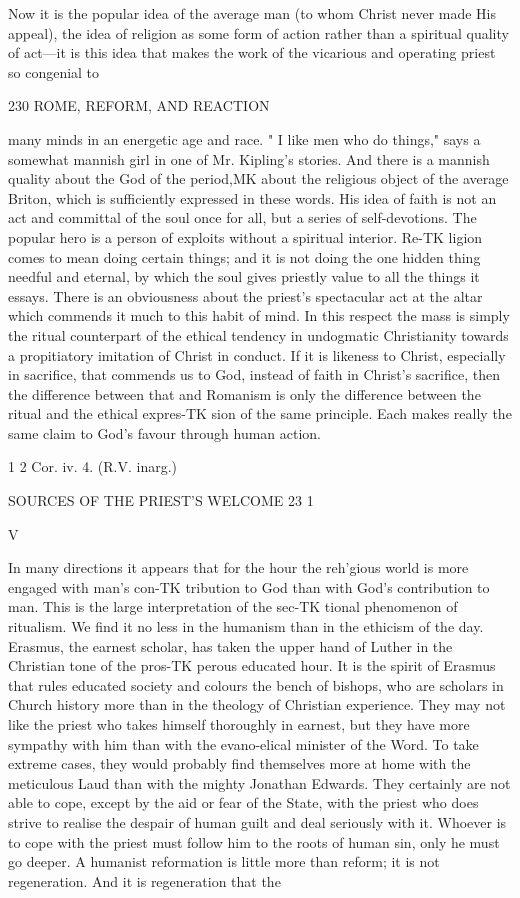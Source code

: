 \documentclass[12pt,a5paper,twoside]{book}
\begin{document}
{{Now it is the popular idea of the average man (to 
whom Christ never made His appeal), the idea of 
religion as some form of action rather than a spiritual 
quality of act---it is this idea that makes the work of 
the vicarious and operating priest so congenial to 



230 ROME, REFORM, AND REACTION 

many minds in an energetic age and race. " I like 
men who do things," says a somewhat mannish girl 
in one of Mr. Kipling's stories. And there is a 
mannish quality about the God of the period,MK about 
the religious object of the average Briton, which is 
sufficiently expressed in these words. His idea of 
faith is not an act and committal of the soul once for 
all, but a series of self-devotions. The popular hero is 
a person of exploits without a spiritual interior. Re-TK
ligion comes to mean doing certain things; and it is 
not doing the one hidden thing needful and eternal, by 
which the soul gives priestly value to all the things 
it essays. There is an obviousness about the priest's 
spectacular act at the altar which commends it much 
to this habit of mind. In this respect the mass is 
simply the ritual counterpart of the ethical tendency 
in undogmatic Christianity towards a propitiatory 
imitation of Christ in conduct. If it is likeness to 
Christ, especially in sacrifice, that commends us to 
God, instead of faith in Christ's sacrifice, then the 
difference between that and Romanism is only the 
difference between the ritual and the ethical expres-TK
sion of the same principle. Each makes really the 
same claim to God's favour through human action. 

1 2 Cor. iv. 4. (R.V. inarg.) 



SOURCES OF THE PRIEST'S WELCOME 23 1 

V 

In many directions it appears that for the hour 
the reh'gious world is more engaged with man's con-TK
tribution to God than with God's contribution to 
man. This is the large interpretation of the sec-TK
tional phenomenon of ritualism. We find it no less 
in the humanism than in the ethicism of the day. 
Erasmus, the earnest scholar, has taken the upper 
hand of Luther in the Christian tone of the pros-TK
perous educated hour. It is the spirit of Erasmus 
that rules educated society and colours the bench of 
bishops, who are scholars in Church history more than 
in the theology of Christian experience. They may 
not like the priest who takes himself thoroughly in 
earnest, but they have more sympathy with him than 
with the evano-elical minister of the Word. To take 
extreme cases, they would probably find themselves 
more at home with the meticulous Laud than with 
the mighty Jonathan Edwards. They certainly are 
not able to cope, except by the aid or fear of the State, 
with the priest who does strive to realise the despair 
of human guilt and deal seriously with it. Whoever 
is to cope with the priest must follow him to the 
roots of human sin, only he must go deeper. A 
humanist reformation is little more than reform; it 
is not regeneration. And it is regeneration that the 



}}
\end{document}

